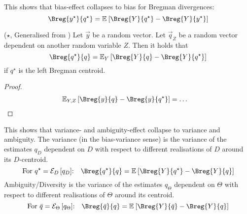 \documentclass[../main.tex]{subfiles}
\begin{document}
This shows that bias-effect collapses to bias for Bregman divergences: 
$$\Breg{y^\star}{q^\star} = \mathbb{E}_{}\left[ \Breg{Y}{q^\star} - \Breg{Y}{y^\star} \right]$$

\begin{lemma} \label{thm:bregman-collapse-variances} ($\star$, Generalised from \cite{ref:wood23})
Let $\vec y$ be a random vector. Let $\vec q_{Z}$ be a random vector dependent on another random variable $Z$. Then it holds that
$$
\Breg{q^\star}{q} = 
\mathbb{E}_{Y}\left[ \Breg{Y}{q} - \Breg{Y}{q^\star} \right]  \\[1em]
$$
if  $q^\star$ is the left Bregman centroid.
\end{lemma}

\begin{proof}
\begin{align*}
\mathbb{E}_{Y,Z}\left[ \Breg{y}{q} - \Breg{y}{q^\star} \right]  &= \dots
\end{align*}
\end{proof}

This shows that variance- and ambiguity-effect collapse to variance and ambiguity. The variance (in the bias-variance sense) is the variance of the estimates $q_D$ dependent on $D$ with respect to different realisations of $D$ around its $D$-centroid. 
$$
\text{For $q^\star = \mathcal{E}_D\left[q_D\right]$:}\hspace{1em}
\Breg{q^\star}{q} = \mathbb{E}_{}\left[ \Breg{Y}{q^\star} - \Breg{Y}{q} \right]
$$
Ambiguity/Diversity is the variance of the estimates $q_\Theta$ dependent on $\Theta$ with respect to different realisations of $\Theta$ around its centroid.
$$
\text{For $\bar{q} = \mathcal{E}_\Theta\left[q_\Theta\right]$:}\hspace{1em}
\Breg{\bar{q}}{q} = \mathbb{E}_{}\left[ \Breg{Y}{\bar{q}} - \Breg{Y}{q} \right]
$$
\end{document}
